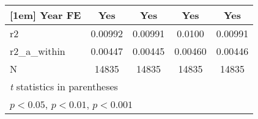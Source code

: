 {\begin{tabular}{l*{4}{c}}
[1em]
Year FE     &         Yes         &         Yes         &         Yes         &         Yes         \\
\hline
r2          &     0.00992         &     0.00991         &      0.0100         &     0.00991         \\
r2\_a\_within &     0.00447         &     0.00445         &     0.00460         &     0.00446         \\
N           &       14835         &       14835         &       14835         &       14835         \\
\hline\hline
\multicolumn{5}{l}{\footnotesize \textit{t} statistics in parentheses}\\
\multicolumn{5}{l}{\footnotesize \sym{*} \(p<0.05\), \sym{**} \(p<0.01\), \sym{***} \(p<0.001\)}\\
\end{tabular}
}
